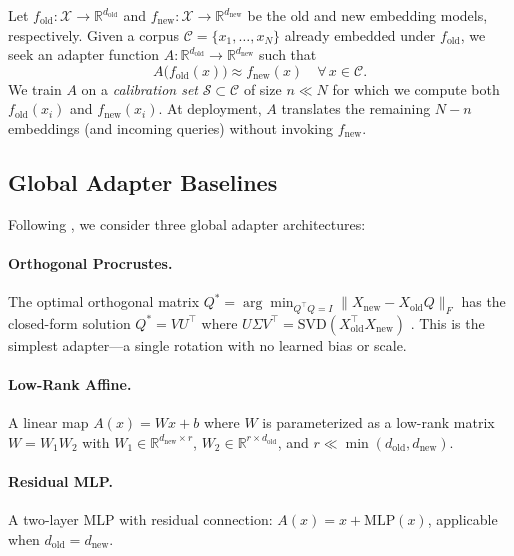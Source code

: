 \documentclass[11pt,a4paper]{article}
\newcommand{\fold}{f_{\mathrm{old}}}
\newcommand{\fnew}{f_{\mathrm{new}}}
\newcommand{\Rbb}{\mathbb{R}}
\begin{document}
Let $\fold : \mathcal{X} \to \Rbb^{d_{\mathrm{old}}}$ and $\fnew : \mathcal{X} \to \Rbb^{d_{\mathrm{new}}}$ be the old and new embedding models, respectively.
Given a corpus $\mathcal{C} = \{x_1, \ldots, x_N\}$ already embedded under $\fold$, we seek an adapter function $A: \Rbb^{d_{\mathrm{old}}} \to \Rbb^{d_{\mathrm{new}}}$ such that
\begin{equation}
  A\bigl(\fold(x)\bigr) \approx \fnew(x) \quad \forall\, x \in \mathcal{C}.
  \label{eq:adapter}
\end{equation}
We train $A$ on a \emph{calibration set} $\mathcal{S} \subset \mathcal{C}$ of size $n \ll N$ for which we compute both $\fold(x_i)$ and $\fnew(x_i)$.
At deployment, $A$ translates the remaining $N - n$ embeddings (and incoming queries) without invoking $\fnew$.

\subsection{Global Adapter Baselines}
\label{sec:method:global}

Following \citet{vejendla2025drift}, we consider three global adapter architectures:

\paragraph{Orthogonal Procrustes.}
The optimal orthogonal matrix $Q^{*} = \arg\min_{Q^\top Q = I} \| X_{\mathrm{new}} - X_{\mathrm{old}} Q \|_F$ has the closed-form solution $Q^{*} = V U^\top$ where $U \Sigma V^\top = \mathrm{SVD}(X_{\mathrm{old}}^\top X_{\mathrm{new}})$ \citep{schoenemann1966procrustes}.
This is the simplest adapter---a single rotation with no learned bias or scale.

\paragraph{Low-Rank Affine.}
A linear map $A(x) = W x + b$ where $W$ is parameterized as a low-rank matrix $W = W_1 W_2$ with $W_1 \in \Rbb^{d_{\mathrm{new}} \times r}$, $W_2 \in \Rbb^{r \times d_{\mathrm{old}}}$, and $r \ll \min(d_{\mathrm{old}}, d_{\mathrm{new}})$.

\paragraph{Residual MLP.}
A two-layer MLP with residual connection: $A(x) = x + \mathrm{MLP}(x)$, applicable when $d_{\mathrm{old}} = d_{\mathrm{new}}$.
\end{document}
